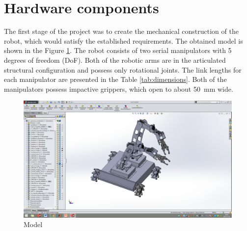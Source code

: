 \section{Hardware components}
\label{sec:hard}

The first stage of the project was to create the mechanical construction of the robot, which would satisfy the established requirements. The obtained model is shown in the Figure \ref{fig:model}.  The robot consists of two serial manipulators with 5 degrees of freedom (DoF). Both of the robotic arms are in the articulated structural configuration and possess only rotational joints. The link lengths for each manipulator are presented in the Table \ref{tab:dimensions}. Both of the manipulators possess impactive grippers, which open to about \SI{50}{\milli\meter} wide.


\begin{figure}[H]
\centering
\includegraphics[trim=21cm 5cm 18cm 5cm, clip=true, totalheight=0.3\textheight]{fig/model}
\caption{Model}
\label{fig:model}
\end{figure}


